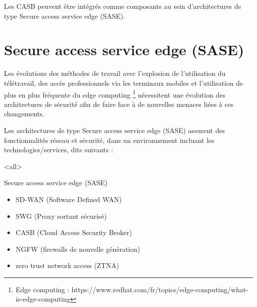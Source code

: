 Les CASB peuvent être intégrés comme composants au sein d'architectures de type Secure access service edge (SASE).

\section{Secure access service edge (SASE)}
Les évolutions des méthodes de travail avec l'explosion de l'utilisation du télétravail, des accès professionnels via les terminaux mobiles et l'utilisation de plus en plus fréquente du edge computing \footnote{Edge computing : https://www.redhat.com/fr/topics/edge-computing/what-is-edge-computing} nécessitent une évolution des architectures de sécurité afin de faire face à de nouvelles menaces liées à ces changements.

Les architectures de type Secure access service edge (SASE) assurent des fonctionnalités réseau et sécurité, dans un environnement  incluant les technologies/services, dits  suivants :

\mode<all>{\texframe
{Secure access service edge (SASE)} %
{} %
{
\begin{itemize}
    \item SD-WAN (Software Defined WAN)
    \item SWG (Proxy sortant sécurisé)
    \item CASB (Cloud Access Security Broker)
    \item NGFW (firewalls de nouvelle génération)
    \item zero trust network access (ZTNA)
\end{itemize}
}}

